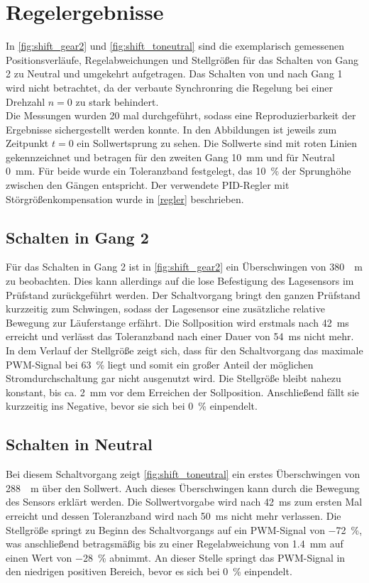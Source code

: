 \section{Regelergebnisse} \label{reglerergebnisse}
In \autoref{fig:shift_gear2} und \autoref{fig:shift_toneutral} sind die exemplarisch gemessenen Positionsverläufe, Regelabweichungen und Stellgrößen für das Schalten von Gang 2 zu Neutral und umgekehrt aufgetragen. Das Schalten von und nach Gang 1 wird nicht betrachtet, da der verbaute Synchronring die Regelung bei einer Drehzahl $n=0$ zu stark behindert.\\
Die Messungen wurden 20 mal durchgeführt, sodass eine Reproduzierbarkeit der Ergebnisse sichergestellt werden konnte. In den Abbildungen ist jeweils zum Zeitpunkt $t=0$ ein Sollwertsprung zu sehen. Die Sollwerte sind mit roten Linien gekennzeichnet und betragen für den zweiten Gang \SI{10}{mm} und für Neutral \SI{0}{mm}. Für beide wurde ein Toleranzband festgelegt, das \SI{10}{\%} der Sprunghöhe zwischen den Gängen entspricht. Der verwendete PID-Regler mit Störgrößenkompensation wurde in \autoref{regler} beschrieben.

\subsection{Schalten in Gang 2}

Für das Schalten in Gang 2 ist in \autoref{fig:shift_gear2} ein Überschwingen von \SI{380}{\mu m} zu beobachten. Dies kann allerdings auf die lose Befestigung des Lagesensors im Prüfstand zurückgeführt werden. Der Schaltvorgang bringt den ganzen Prüfstand kurzzeitig zum Schwingen, sodass der Lagesensor eine zusätzliche relative Bewegung zur Läuferstange erfährt. Die Sollposition wird erstmals nach \SI{42}{ms} erreicht und verlässt das Toleranzband nach einer Dauer von \SI{54}{ms} nicht mehr. In dem Verlauf der Stellgröße zeigt sich, dass für den Schaltvorgang das maximale PWM-Signal bei \SI{63}{\%} liegt und somit ein großer Anteil der möglichen Stromdurchschaltung gar nicht ausgenutzt wird. Die Stellgröße bleibt nahezu konstant, bis ca. \SI{2}{mm} vor dem Erreichen der Sollposition. Anschließend fällt sie kurzzeitig ins Negative, bevor sie sich bei \SI{0}{\%} einpendelt.  

\subsection{Schalten in Neutral}
Bei diesem Schaltvorgang zeigt \autoref{fig:shift_toneutral} ein erstes Überschwingen von \SI{288}{\mu m} über den Sollwert. Auch dieses Überschwingen kann durch die Bewegung des Sensors erklärt werden. Die Sollwertvorgabe wird nach \SI{42}{ms} zum ersten Mal erreicht und dessen Toleranzband wird nach \SI{50}{ms} nicht mehr verlassen. Die Stellgröße springt zu Beginn des Schaltvorgangs auf ein PWM-Signal von \SI{-72}{\%}, was anschließend betragsmäßig bis zu einer Regelabweichung von \SI{1,4}{mm} auf einen Wert von \SI{-28}{\%} abnimmt. An dieser Stelle springt das PWM-Signal in den niedrigen positiven Bereich, bevor es sich bei \SI{0}{\%} einpendelt.

